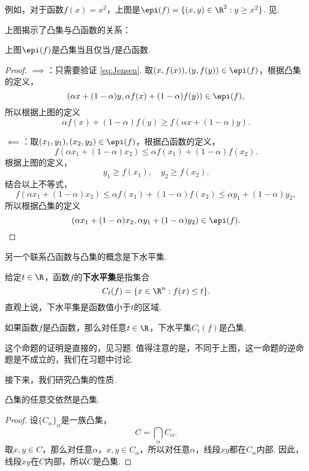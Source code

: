 例如，对于函数$f(x)=x^2$，上图是$\epi(f)=\{(x,y)\in\R^2:y\geq x^2\}$. 见.

上图揭示了凸集与凸函数的关系：
\begin{theorem}
    上图$\epi(f)$是凸集当且仅当$f$是凸函数.
\end{theorem}

\begin{proof}
$\implies$：只需要验证 \eqref{eq:Jensen}. 取$(x,f(x)),(y,f(y))\in\epi(f)$，根据凸集的定义，
\[(\alpha x+(1-\alpha)y,\alpha f(x)+(1-\alpha)f(y))\in\epi(f),\]
所以根据上图的定义
\[\alpha f(x)+(1-\alpha)f(y)\geq f(\alpha x+(1-\alpha)y).\]

$\impliedby$：取$(x_1,y_1),(x_2,y_2)\in\epi(f)$，根据凸函数的定义，
\[f(\alpha x_1+(1-\alpha) x_2)\leq\alpha f(x_1)+(1-\alpha)f(x_2).\]
根据上图的定义，
\[y_1\geq f(x_1),\quad y_2\geq f(x_2).\]
结合以上不等式，
\[f(\alpha x_1+(1-\alpha) x_2)\leq\alpha f(x_1)+(1-\alpha)f(x_2)\leq\alpha y_1+(1-\alpha) y_2,\]
所以根据凸集的定义
\[(\alpha x_1+(1-\alpha) x_2,\alpha y_1+(1-\alpha) y_2)\in\epi(f).\]
\end{proof}

另一个联系凸函数与凸集的概念是下水平集. 
\begin{definition}[下水平集]
    给定$t\in\R$，函数$f$的\textbf{下水平集}是指集合
    \[C_t(f)=\{x\in\R^n:f(x)\leq t\}.\]
    直观上说，下水平集是函数值小于$t$的区域.
\end{definition}

\begin{proposition}\label{prop:level-set}
    如果函数$f$是凸函数，那么对任意$t\in\R$，下水平集$C_t(f)$是凸集.
\end{proposition}
这个命题的证明是直接的，见习题. 值得注意的是，不同于上图，这一命题的逆命题是不成立的，我们在习题中讨论. 

接下来，我们研究凸集的性质.

\begin{proposition}\label{prop:convex-set-intersect}
    凸集的任意交依然是凸集.
\end{proposition}
\begin{proof}
    设$\{C_\alpha\}_\alpha$是一族凸集，
    \[C=\bigcap_\alpha C_\alpha.\]
    取$x,y\in C$，那么对任意$\alpha$，$x,y\in C_\alpha$，所以对任意$\alpha$，线段$xy$都在$C_\alpha$内部. 因此，线段$xy$在$C$内部，所以$C$是凸集.
\end{proof}

